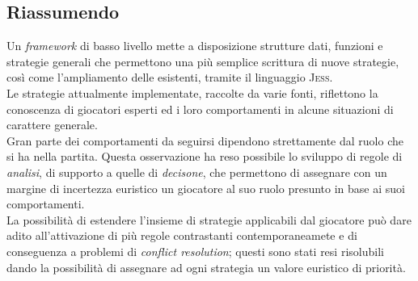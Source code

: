 \subsection{Riassumendo}

Un \emph{framework} di basso livello mette a disposizione strutture dati, funzioni e strategie generali che permettono una più semplice scrittura di nuove strategie, così come l'ampliamento delle esistenti, tramite il linguaggio \textsc{Jess}.\\
Le strategie attualmente implementate, raccolte da varie fonti, riflettono la conoscenza di giocatori esperti ed i loro comportamenti in alcune situazioni di carattere generale.\\
Gran parte dei comportamenti da seguirsi dipendono strettamente dal ruolo che si ha nella partita. Questa osservazione ha reso possibile lo sviluppo di regole di \emph{analisi}, di supporto a quelle di \emph{decisone}, che permettono di assegnare con un margine di incertezza euristico un giocatore al suo ruolo presunto in base ai suoi comportamenti.\\
La possibilità di estendere l'insieme di strategie applicabili dal giocatore può dare adito all'attivazione di più regole contrastanti contemporaneamete e di conseguenza a problemi di \emph{conflict resolution}; questi sono stati resi risolubili dando la possibilità di assegnare ad ogni strategia un valore euristico di priorità.
